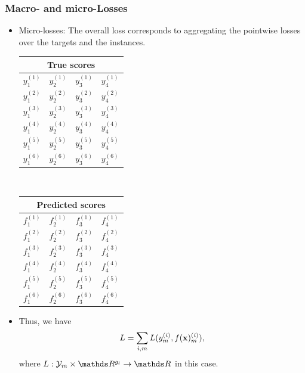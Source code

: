 \documentclass[11pt,compress,t,notes=noshow, xcolor=table]{beamer}
\begin{document}
\begin{frame}
	\frametitle{Macro- and micro-Losses}
	
	\begin{itemize}
		\item<1-> Micro-losses: The overall loss corresponds to aggregating the pointwise losses over the targets and the instances.
		
		\begin{center}
			\begin{tabular}{|c|c|c|c|}
				\multicolumn{4}{c}{True scores} \\
				\hline
				\color{putred}$y_1^{(1)}$ & \color{putred}$y_2^{(1)}$ & \color{putred}$y_3^{(1)}$ & \color{putred}$y_4^{(1)}$ \\
				\color{putred}$y_1^{(2)}$ & \color{putred}$y_2^{(2)}$ & \color{putred}$y_3^{(2)}$ & \color{putred}$y_4^{(2)}$ \\
				\color{putred}$y_1^{(3)}$ & \color{putred}$y_2^{(3)}$ & \color{putred}$y_3^{(3)}$ & \color{putred}$y_4^{(3)}$ \\
				\color{putred}$y_1^{(4)}$ & \color{putred}$y_2^{(4)}$ & \color{putred}$y_3^{(4)}$ & \color{putred}$y_4^{(4)}$ \\
				\color{putred}$y_1^{(5)}$ & \color{putred}$y_2^{(5)}$ & \color{putred}$y_3^{(5)}$ & \color{putred}$y_4^{(5)}$ \\
				\color{putred}$y_1^{(6)}$ & \color{putred}$y_2^{(6)}$ & \color{putred}$y_3^{(6)}$ & \color{putred}$y_4^{(6)}$ \\
				\hline
			\end{tabular}
			$\quad$
			\begin{tabular}{|c|c|c|c|}
				\multicolumn{4}{c}{Predicted scores} \\
				\hline
				\color{putred}$f_1^{(1)}$ & \color{putred}$f_2^{(1)}$ & \color{putred}$f_3^{(1)}$ & \color{putred}$f_4^{(1)}$ \\
				\color{putred}$f_1^{(2)}$ & \color{putred}$f_2^{(2)}$ & \color{putred}$f_3^{(2)}$ & \color{putred}$f_4^{(2)}$ \\
				\color{putred}$f_1^{(3)}$ & \color{putred}$f_2^{(3)}$ & \color{putred}$f_3^{(3)}$ & \color{putred}$f_4^{(3)}$ \\
				\color{putred}$f_1^{(4)}$ & \color{putred}$f_2^{(4)}$ & \color{putred}$f_3^{(4)}$ & \color{putred}$f_4^{(4)}$ \\
				\color{putred}$f_1^{(5)}$ & \color{putred}$f_2^{(5)}$ & \color{putred}$f_3^{(5)}$ & \color{putred}$f_4^{(5)}$ \\
				\color{putred}$f_1^{(6)}$ & \color{putred}$f_2^{(6)}$ & \color{putred}$f_3^{(6)}$ & \color{putred}$f_4^{(6)}$ \\
				\hline
			\end{tabular}
		\end{center}
	\lz
	\item Thus, we have	
	$$
	L =  \sum_{i,m} L(y_m^{(i)} , f(\mathbf{x})_m^{(i)}),
	$$
	where $L: \Yspace_m \times \R^{g_l} \to \R$ in this case.
%	
	\end{itemize}

\end{frame}
\end{document}
